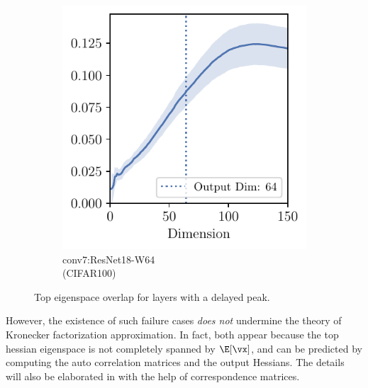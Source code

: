 \begin{figure}[h]
\begin{subfigure}[b]{0.23\textwidth}
        \includegraphics[width=\textwidth]{Appendix_Figures/Overlap_large_model/FailCases/late/CIFAR100_Resnet18W64New_nobn_fixlr0.01_conv7.pdf}
        \caption{conv7:ResNet18-W64\\(CIFAR100)}
        \label{fig:app_adexp_overlap_late_resnet}
    \end{subfigure}
    \captionsetup{justification=centering}
    \caption{Top eigenspace overlap for layers with a delayed peak.}
    \label{fig:app_adexp_failure_late}
\end{figure}

However, the existence of such failure cases \emph{does not} undermine the theory of Kronecker factorization approximation. In fact, both appear because the top hessian eigenspace is not completely spanned by $\E[\vx]$,  and can be predicted by computing the auto correlation matrices and the output Hessians. The details will also be elaborated in  with the help of correspondence matrices.


